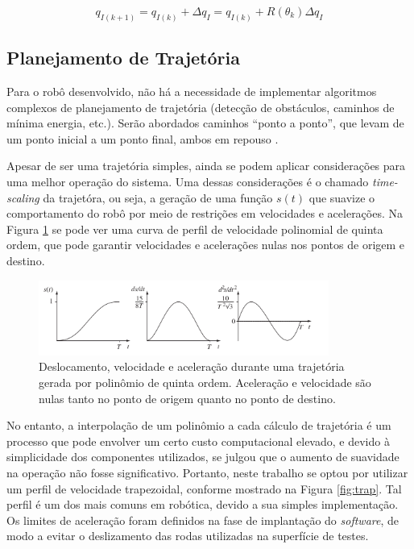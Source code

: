 \begin{equation}
  q_{I(k+1)} = q_{I(k)} + \Delta q_I = q_{I(k)} + R(\theta_k) \Delta q_I
  \label{eq:new_odo}
\end{equation}

\subsection{Planejamento de Trajetória}

Para o robô desenvolvido, não há a necessidade de implementar algoritmos complexos de planejamento de trajetória (detecção de obstáculos, caminhos de mínima energia, etc.). Serão abordados caminhos ``ponto a ponto'', que levam de um ponto inicial a um ponto final, ambos em repouso \citep{lynch2017modern}.

Apesar de ser uma trajetória simples, ainda se podem aplicar considerações para uma melhor operação do sistema. Uma dessas considerações é o chamado \textit{time-scaling} da trajetóra, ou seja, a geração de uma função $s(t)$ que suavize o comportamento do robô por meio de restrições em velocidades e acelerações. Na Figura \ref{fig:poly5} se pode ver uma curva de perfil de velocidade polinomial de quinta ordem, que pode garantir velocidades e acelerações nulas nos pontos de origem e destino.

\begin{figure}[h]
  \centering
  \includegraphics[width = 0.85\textwidth]{imagens/poly5}
  \caption{Deslocamento, velocidade e aceleração durante uma trajetória gerada por polinômio de quinta ordem. Aceleração e velocidade são nulas tanto no ponto de origem quanto no ponto de destino.}
  \label{fig:poly5}
\end{figure}

No entanto, a interpolação de um polinômio a cada cálculo de trajetória é um processo que pode envolver um certo custo computacional elevado, e devido à simplicidade dos componentes utilizados, se julgou que o aumento de suavidade na operação não fosse significativo. Portanto, neste trabalho se optou por utilizar um perfil de velocidade trapezoidal, conforme mostrado na Figura \ref{fig:trap}. Tal perfil é um dos mais comuns em robótica, devido a sua simples implementação. Os limites de aceleração foram definidos na fase de implantação do \textit{software}, de modo a evitar o deslizamento das rodas utilizadas na superfície de testes.

